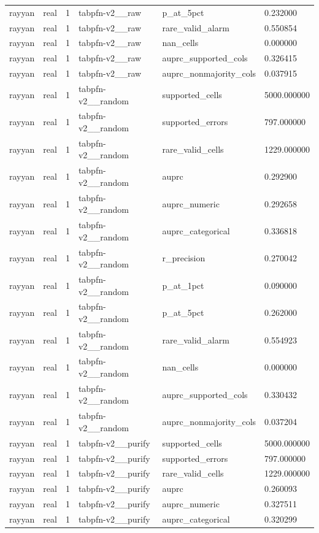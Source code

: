 \begin{tabular}{llllll}
rayyan & real & 1 & tabpfn-v2\_\_raw & p\_at\_5pct & 0.232000 \\
rayyan & real & 1 & tabpfn-v2\_\_raw & rare\_valid\_alarm & 0.550854 \\
rayyan & real & 1 & tabpfn-v2\_\_raw & nan\_cells & 0.000000 \\
rayyan & real & 1 & tabpfn-v2\_\_raw & auprc\_supported\_cols & 0.326415 \\
rayyan & real & 1 & tabpfn-v2\_\_raw & auprc\_nonmajority\_cols & 0.037915 \\
rayyan & real & 1 & tabpfn-v2\_\_random & supported\_cells & 5000.000000 \\
rayyan & real & 1 & tabpfn-v2\_\_random & supported\_errors & 797.000000 \\
rayyan & real & 1 & tabpfn-v2\_\_random & rare\_valid\_cells & 1229.000000 \\
rayyan & real & 1 & tabpfn-v2\_\_random & auprc & 0.292900 \\
rayyan & real & 1 & tabpfn-v2\_\_random & auprc\_numeric & 0.292658 \\
rayyan & real & 1 & tabpfn-v2\_\_random & auprc\_categorical & 0.336818 \\
rayyan & real & 1 & tabpfn-v2\_\_random & r\_precision & 0.270042 \\
rayyan & real & 1 & tabpfn-v2\_\_random & p\_at\_1pct & 0.090000 \\
rayyan & real & 1 & tabpfn-v2\_\_random & p\_at\_5pct & 0.262000 \\
rayyan & real & 1 & tabpfn-v2\_\_random & rare\_valid\_alarm & 0.554923 \\
rayyan & real & 1 & tabpfn-v2\_\_random & nan\_cells & 0.000000 \\
rayyan & real & 1 & tabpfn-v2\_\_random & auprc\_supported\_cols & 0.330432 \\
rayyan & real & 1 & tabpfn-v2\_\_random & auprc\_nonmajority\_cols & 0.037204 \\
rayyan & real & 1 & tabpfn-v2\_\_purify & supported\_cells & 5000.000000 \\
rayyan & real & 1 & tabpfn-v2\_\_purify & supported\_errors & 797.000000 \\
rayyan & real & 1 & tabpfn-v2\_\_purify & rare\_valid\_cells & 1229.000000 \\
rayyan & real & 1 & tabpfn-v2\_\_purify & auprc & 0.260093 \\
rayyan & real & 1 & tabpfn-v2\_\_purify & auprc\_numeric & 0.327511 \\
rayyan & real & 1 & tabpfn-v2\_\_purify & auprc\_categorical & 0.320299 \\

\end{tabular}
